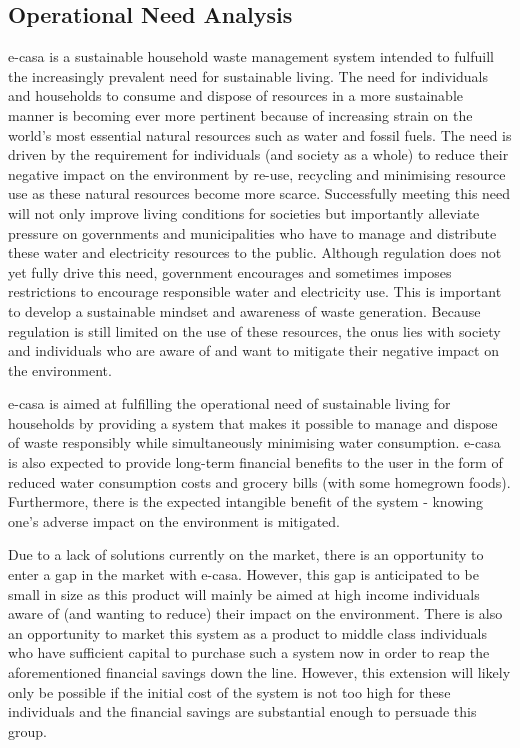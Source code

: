 \documentclass[a4paper,11pt,fleqn]{report}
\begin{document}
\subsection{Operational Need Analysis} \label{Ssec: Operational Need}
\ac{e-casa} is a sustainable household waste management system intended to fulfuill the increasingly prevalent need for sustainable living. The need for individuals and households to consume and dispose of resources in a more sustainable manner is becoming ever more pertinent because of increasing strain on the world's most essential natural resources such as water and fossil fuels. The need is driven by the requirement for individuals (and society as a whole) to reduce their negative impact on the environment by re-use, recycling and minimising resource use as these natural resources become more scarce. Successfully meeting this need will not only improve living conditions for societies but importantly alleviate pressure on governments and municipalities who have to manage and distribute these water and electricity resources to the public.
Although regulation does not yet fully drive this need, government encourages and sometimes imposes restrictions to encourage responsible water and electricity use. This is important to develop a sustainable mindset and awareness of waste generation. Because regulation is still limited on the use of these resources, the onus lies with society and individuals who are aware of and want to mitigate their negative impact on the environment.

\ac{e-casa} is aimed at fulfilling the operational need of sustainable living for households by providing a system that makes it possible to manage and dispose of waste responsibly while simultaneously minimising water consumption. \ac{e-casa} is also expected to provide long-term financial benefits to the user in the form of reduced water consumption costs and grocery bills (with some homegrown foods). Furthermore, there is the expected intangible benefit of the system - knowing one's adverse impact on the environment is mitigated.

Due to a lack of solutions currently on the market, there is an opportunity to enter a gap in the market with \ac{e-casa}. However, this gap is anticipated to be small in size as this product will mainly be aimed at high income individuals aware of (and wanting to reduce) their impact on the environment. There is also an opportunity to market this system as a product to middle class individuals who have sufficient capital to purchase such a system now in order to reap the aforementioned financial savings down the line. However, this extension will likely only be possible if the initial cost of the system is not too high for these individuals and the financial savings are substantial enough to persuade this group.\\
\end{document}
